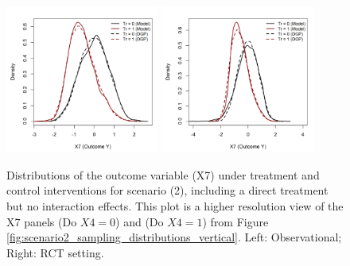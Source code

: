 \begin{figure}[htbp]
\centering
\includegraphics[width=0.45\textwidth]{img/results/observ_scenario2_X7_treatment_densities.png}
\includegraphics[width=0.45\textwidth]{img/results/rct_scenario2_X7_treatment_densities.png}
\caption{Distributions of the outcome variable (X7) under treatment and control interventions for scenario (2), including a direct treatment but no interaction effects. This plot is a higher resolution view of the X7 panels (Do $X4=0$) and (Do $X4=1$) from Figure \ref{fig:scenario2_sampling_distributions_vertical}. Left: Observational; Right: RCT setting.}
\label{fig:scenario2_outcome_distributions}
\end{figure}




